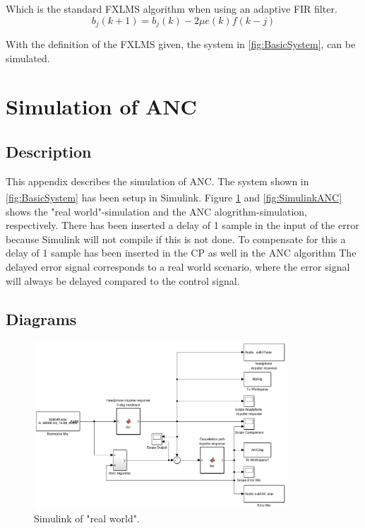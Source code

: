 Which is the standard FXLMS algorithm when using an adaptive FIR filter.
\begin{equation}\label{eq:FXLMSw_j(k+1)}
b_j(k+1) = b_j(k) - 2\mu e(k)f(k-j)
\end{equation}

With the definition of the FXLMS given, the system in \autoref{fig:BasicSystem}, can be simulated.
















\newpage
\section{Simulation of ANC} \label{sec:ANCSimulation}
\subsection{Description}
This appendix describes the simulation of ANC. The system shown in \autoref{fig:BasicSystem} has been setup in Simulink\textsuperscript{\textregistered}. Figure \ref{fig:SimulinkRealWorld} and \autoref{fig:SimulinkANC} shows the "real world"-simulation and the ANC alogrithm-simulation, respectively. There has been inserted a delay of 1 sample in the input of the error because Simulink will not compile if this is not done. To compensate for this a delay of 1 sample has been inserted in the CP as well in the ANC algorithm The delayed error signal corresponds to a real world scenario, where the error signal will always be delayed compared to the control signal.   

\subsection{Diagrams}
\begin{figure}[H]
	\centering
	\includegraphics[width=0.85\textwidth]{figures/BasicSystem/SimulinkRealWorld}
	\caption{Simulink of "real world".}
	\label{fig:SimulinkRealWorld}
\end{figure}    

